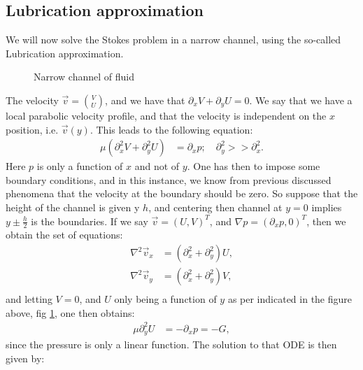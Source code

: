 \documentclass[a4paper]{article}
\begin{document}
\subsection{Lubrication approximation}\label{sec: Lubrication approximation}
We will now solve the Stokes problem in a narrow channel, using the so-called Lubrication approximation.
\begin{figure}[H]
    \centering
    \caption{Narrow channel of fluid}
    \label{fig: Lubrication approximation}
\end{figure}\noindent
The velocity $\vec{v}=\binom{V}{U}$, and we have that $\partial_x V + \partial_y U = 0$. We say that we have a local parabolic velocity profile, and that the velocity is independent on the $x$ position, i.e. $\vec{v}(y)$.
This leads to the following equation:
\begin{align*}
    \mu\left(\partial_x^2V + \partial_y^2U\right) &= \partial_x p; \quad \partial_y^2 >> \partial_x^2.
\end{align*}Here $p$ is only a function of $x$ and not of $y$. One has then to impose some boundary conditions, and in this instance, we know from previous discussed phenomena that the velocity at the boundary should be zero.
So suppose that the height of the channel is given y $h$, and centering then channel at $y=0$ implies $y \pm \frac{h}{2}$ is the boundaries. If we say $\vec{v} = (U, V)^T$, and $\nabla p = (\partial_x p, 0)^T$, then we obtain the set of equations:
\begin{align*}
    \nabla^2\vec{v}_x &= \left(\partial_x^2 + \partial_y^2\right)U,\\
    \nabla^2\vec{v}_y &= \left(\partial_x^2 + \partial_y^2\right)V,\\
\end{align*}and letting $V = 0$, and $U$ only being a function of $y$ as per indicated in the figure above, fig \ref{fig: Lubrication approximation}, one then obtains:
\begin{align*}
    \mu\partial_y^2U &= -\partial_x p = -G,
\end{align*}since the pressure is only a linear function. The solution to that ODE is then given by:
\end{document}

